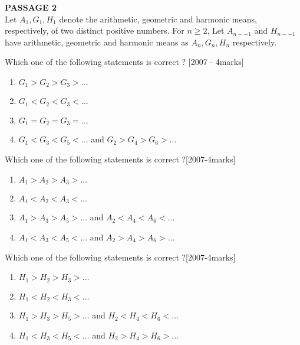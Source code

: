 \iffalse
\title{Assignment -1}
\author{ee24btech11017-karthik}
\section{paragraph}
\fi
\item[] \textbf{PASSAGE 2} \\
Let $A_{1}, G_{1}, H_{1} $ denote the arithmetic, geometric and harmonic means, respectively, of two distinct positive numbers. For $n\geq 2$, Let $A_{n--1}$ and $H_{n--1}$ have arithmetic, geometric and harmonic means as $A_{n},G_{n},H_{n}$ respectively.
  
\item Which one of the following statements is correct ? \hfill{[2007 - 4marks]}
\begin{enumerate}
	\item$G_{1}>G_{2}>G_{3}>\dots$ 
	\item$G_{1}<G_{2}<G_{3}<\dots$
	\item$G_{1}=G_{2}=G_{3}=\dots$
	\item$G_{1}<G_{3}<G_{5}<\dots$ and $G_{2}>G_{4}>G_{6}>\dots$
\end{enumerate}

\item Which one of the following statements is correct ?\hfill[2007-4marks]
\begin{enumerate}
	\item $A_{1}>A_{2}>A_{3}>\dots$ 
	\item $A_{1}<A_{2}<A_{3}<\dots$
	\item $A_{1}>A_{3}>A_{5}>\dots$ and $A_{2}<A_{4}<A_{6}<\dots$
	\item $A_{1}<A_{3}<A_{5}<\dots$ and $A_{2}>A_{4}>A_{6}>\dots$
\end{enumerate}

\item Which one of the following statements is correct ?\hfill[2007-4marks]
\begin{enumerate}
	\item $H_{1}>H_{2}>H_{3}>\dots$ 
	\item $H_{1}<H_{2}<H_{3}<\dots$
	\item $H_{1}>H_{3}>H_{5}>\dots$ and $H_{2}<H_{4}<H_{6}<\dots$
	\item $H_{1}<H_{3}<H_{5}<\dots$ and $H_{2}>H_{4}>H_{6}>\dots$
\end{enumerate}
